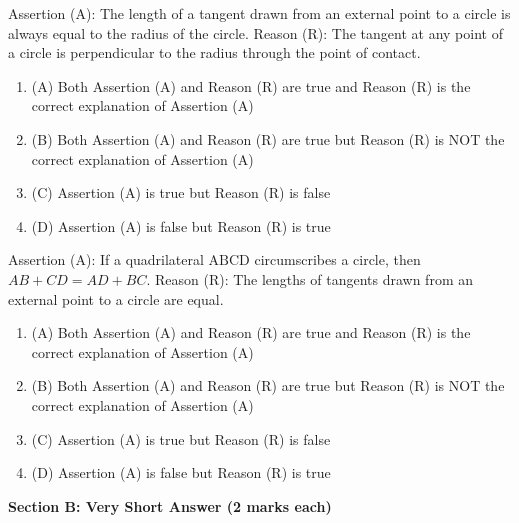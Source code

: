 \documentclass[12pt,a4paper]{exam}
\begin{document}
\begin{questions}
\question[1] Assertion (A): The length of a tangent drawn from an external point to a circle is always equal to the radius of the circle. Reason (R): The tangent at any point of a circle is perpendicular to the radius through the point of contact.
\begin{enumerate}[label=(\Alph*)]
  \item (A) Both Assertion (A) and Reason (R) are true and Reason (R) is the correct explanation of Assertion (A)
  \item (B) Both Assertion (A) and Reason (R) are true but Reason (R) is NOT the correct explanation of Assertion (A)
  \item (C) Assertion (A) is true but Reason (R) is false
  \item (D) Assertion (A) is false but Reason (R) is true
\end{enumerate}
\vspace{0.15cm}

\question[1] Assertion (A): If a quadrilateral $\text{ABCD}$ circumscribes a circle, then $AB + CD = AD + BC$. Reason (R): The lengths of tangents drawn from an external point to a circle are equal.
\begin{enumerate}[label=(\Alph*)]
  \item (A) Both Assertion (A) and Reason (R) are true and Reason (R) is the correct explanation of Assertion (A)
  \item (B) Both Assertion (A) and Reason (R) are true but Reason (R) is NOT the correct explanation of Assertion (A)
  \item (C) Assertion (A) is true but Reason (R) is false
  \item (D) Assertion (A) is false but Reason (R) is true
\end{enumerate}
\vspace{0.15cm}

\end{questions}
\bigskip
\noindent\textbf{\large Section B: Very Short Answer (2 marks each)}
\end{document}
